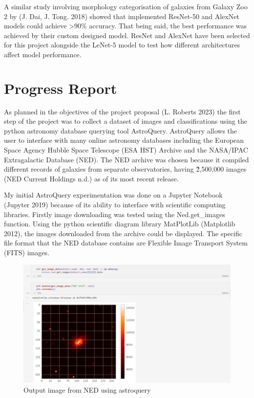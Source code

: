 \documentclass[12pt,runningheads]{llncs}
\begin{document}
A similar study involving morphology categorisation of galaxies from
Galaxy Zoo 2 by (J. Dai, J. Tong. 2018) showed that implemented
ResNet-50 and AlexNet models could achieve \textgreater90\%
accuracy. That being said, the best performance was achieved by their
custom designed model. ResNet and AlexNet have
been selected for this project alongside the LeNet-5 model to test
how different architectures affect model performance.

\newpage
\section{Progress Report}
As planned in the objectives of the project proposal (L. Roberts 2023)
the first step of the project was to collect a dataset of images and
classifications using the python astronomy database querying tool AstroQuery.
AstroQuery allows the user to interface with many online astronomy databases
including the European Space Agency Hubble Space Telescope (ESA HST)
Archive and the NASA/IPAC Extragalactic Database (NED). The NED archive
was chosen because it compiled different records of galaxies from separate
observatories, having \~2,500,000 images (NED Current Holdings n.d.) as 
of its most recent release.

My initial AstroQuery experimentation was done on a Jupyter Notebook 
(Jupyter 2019) because of its ability to interface with scientific computing
libraries. Firstly image downloading was tested using the Ned.get\_images function. 
Using the python scientific diagram library MatPlotLib (Matplotlib 2012),
the images downloaded from the archive could be displayed. The specific
file format that the NED database contains are Flexible Image Transport System 
(FITS) images.

\begin{figure}[h]
    \includegraphics[scale=0.3]{Screenshot_2024-01-31_21-26-47.png}
    \centering
    \caption{Output image from NED using astroquery}\label{tab1}
\end{figure}
\end{document}
